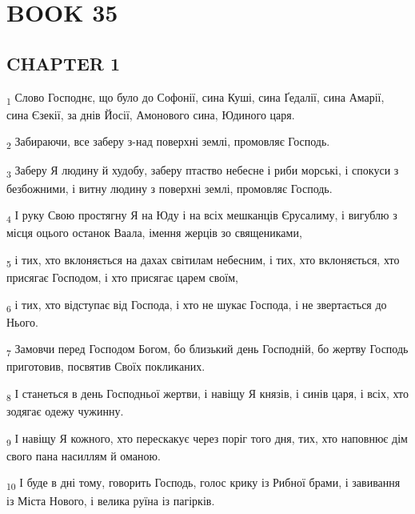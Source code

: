 \section{BOOK 35}
\subsection{CHAPTER 1}
\begin{tcolorbox}
\textsubscript{1} Слово Господнє, що було до Софонії, сина Куші, сина Ґедалії, сина Амарії, сина Єзекії, за днів Йосії, Амонового сина, Юдиного царя.
\end{tcolorbox}
\begin{tcolorbox}
\textsubscript{2} Забираючи, все заберу з-над поверхні землі, промовляє Господь.
\end{tcolorbox}
\begin{tcolorbox}
\textsubscript{3} Заберу Я людину й худобу, заберу птаство небесне і риби морські, і спокуси з безбожними, і витну людину з поверхні землі, промовляє Господь.
\end{tcolorbox}
\begin{tcolorbox}
\textsubscript{4} І руку Свою простягну Я на Юду і на всіх мешканців Єрусалиму, і вигублю з місця оцього останок Ваала, імення жерців зо священиками,
\end{tcolorbox}
\begin{tcolorbox}
\textsubscript{5} і тих, хто вклоняється на дахах світилам небесним, і тих, хто вклоняється, хто присягає Господом, і хто присягає царем своїм,
\end{tcolorbox}
\begin{tcolorbox}
\textsubscript{6} і тих, хто відступає від Господа, і хто не шукає Господа, і не звертається до Нього.
\end{tcolorbox}
\begin{tcolorbox}
\textsubscript{7} Замовчи перед Господом Богом, бо близький день Господній, бо жертву Господь приготовив, посвятив Своїх покликаних.
\end{tcolorbox}
\begin{tcolorbox}
\textsubscript{8} І станеться в день Господньої жертви, і навіщу Я князів, і синів царя, і всіх, хто зодягає одежу чужинну.
\end{tcolorbox}
\begin{tcolorbox}
\textsubscript{9} І навіщу Я кожного, хто перескакує через поріг того дня, тих, хто наповнює дім свого пана насиллям й оманою.
\end{tcolorbox}
\begin{tcolorbox}
\textsubscript{10} І буде в дні тому, говорить Господь, голос крику із Рибної брами, і завивання із Міста Нового, і велика руїна із пагірків.
\end{tcolorbox}
